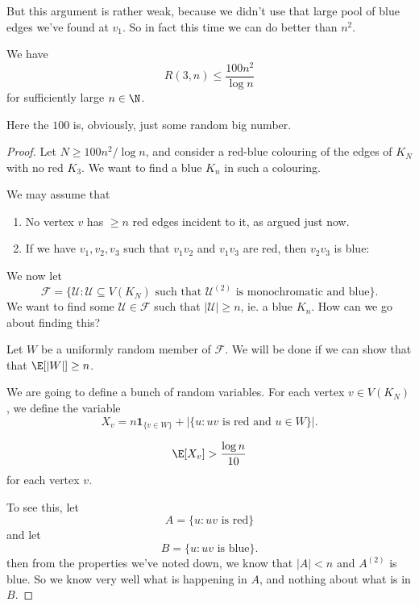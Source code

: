 \documentclass[a4paper]{article}
\begin{document}
But this argument is rather weak, because we didn't use that large pool of blue edges we've found at $v_1$. So in fact this time we can do better than $n^2$.
\begin{thm}
  We have
  \[
    R(3, n) \leq \frac{100 n^2}{\log n}
  \]
  for sufficiently large $n \in \N$.
\end{thm}
Here the $100$ is, obviously, just some random big number.

\begin{proof}
  Let $N \geq 100n^2/\log n$, and consider a red-blue colouring of the edges of $K_N$ with no red $K_3$. We want to find a blue $K_n$ in such a colouring.

  We may assume that
  \begin{enumerate}
    \item No vertex $v$ has $ \geq n$ red edges incident to it, as argued just now.
    \item If we have $v_1, v_2, v_3$ such that $v_1v_2$ and $v_1 v_3$ are red, then $v_2 v_3$ is blue:
      \begin{center}
      \end{center}
  \end{enumerate}
  We now let
  \[
    \mathcal{F} = \{\mathcal{U} : \mathcal{U} \subseteq V(K_N)\text{ such that }\mathcal{U}^{(2)} \text{ is monochromatic and blue}\}.
  \]
  We want to find some $\mathcal{U} \in \mathcal{F}$ such that $|\mathcal{U}| \geq n$, ie. a blue $K_n$. How can we go about finding this?

  Let $W$ be a uniformly random member of $\mathcal{F}$. We will be done if we can show that that $\E[|W|] \geq n$.

  We are going to define a bunch of random variables. For each vertex $v \in V(K_N)$, we define the variable
  \[
    X_v = n \mathbf{1}_{\{v \in W\}} + |\{u: uv\text{ is red and }u \in W\}|.
  \]
  \begin{claim}
   \[
    \E[X_v] > \frac{\log n}{10}
  \]
  for each vertex $v$.
  \end{claim}
  To see this, let
  \[
    A = \{u: uv \text{ is red}\}
  \]
  and let
  \[
    B = \{u: uv \text{ is blue}\}.
  \]
  then from the properties we've noted down, we know that $|A| < n$ and $A^{(2)}$ is blue. So we know very well what is happening in $A$, and nothing about what is in $B$.


\end{proof}
\end{document}

